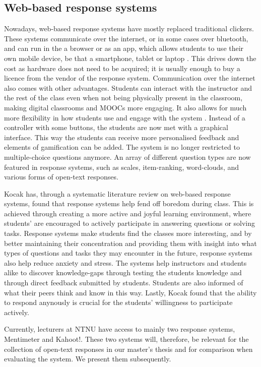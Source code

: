 \subsection{Web-based response systems}
Nowadays, web-based response systems have mostly replaced traditional clickers. These systems communicate over the internet, or in some cases over bluetooth, and can run in the a browser or as an app, which allows students to use their own mobile device, be that a smartphone, tablet or laptop \cite{resyslitrev}. This drives down the cost as hardware does not need to be acquired; it is usually enough to buy a licence from the vendor of the response system. Communication over the internet also comes with other advantages. Students can interact with the instructor and the rest of the class even when not being physically present in the classroom, making digital classrooms and MOOCs more engaging. It also allows for much more flexibility in how students use and engage with the system \cite{resyslitrev}. Instead of a controller with some buttons, the students are now met with a graphical interface. This way the students can receive more personalised feedback and elements of gamification can be added. The system is no longer restricted to multiple-choice questions anymore. An array of different question types are now featured in response systems, such as scales, item-ranking, word-clouds, and various forms of open-text responses.

Kocak \cite{resyslitrev} has, through a systematic literature review on web-based response systems, found that response systems help fend off boredom during class. This is achieved through creating a more active and joyful learning environment, where students' are encouraged to actively participate in answering questions or solving tasks. Response systems make students find the classes more interesting, and by better maintaining their concentration and providing them with insight into what types of questions and tasks they may encounter in the future, response systems also help reduce anxiety and stress. The systems help instructors and students alike to discover knowledge-gaps through testing the students knowledge and through direct feedback submitted by students. Students are also informed of what their peers think and know in this way. Lastly, Kocak found that the ability to respond anynously is crucial for the students' willingness to participate actively. 

Currently, lecturers at NTNU have access to mainly two response systems, Mentimeter and Kahoot!. These two systems will, therefore, be relevant for the collection of open-text responses in our master's thesis and for comparison when evaluating the system. We present them subsequently.

